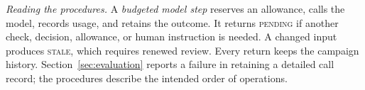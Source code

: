 \noindent\emph{Reading the procedures.}
A \emph{budgeted model step} reserves an allowance, calls the model, records usage, and retains the outcome. It returns \textsc{pending} if another check, decision, allowance, or human instruction is needed. A changed input produces \textsc{stale}, which requires renewed review. Every return keeps the campaign history. Section~\ref{sec:evaluation} reports a failure in retaining a detailed call record; the procedures describe the intended order of operations.
